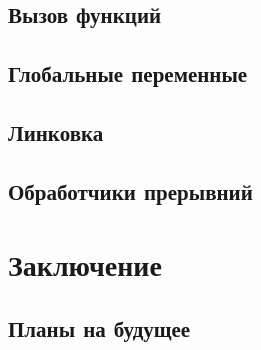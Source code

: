 \documentclass[a4paper,14pt]{extarticle}
\begin{document}
\subsection{Вызов функций}
\subsection{Глобальные переменные}
\subsection{Линковка}
\subsection{Обработчики прерывний}

\pagebreak
\section{Заключение}
\subsection{Планы на будущее}


\printbibliography
{}




	
\end{document}
